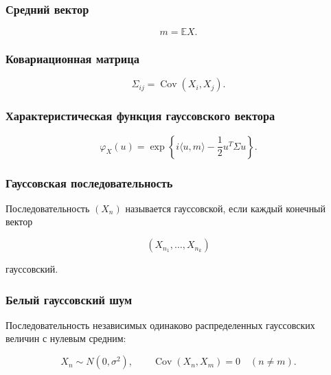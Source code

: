 \documentclass[
  11pt,
  a4paper,
]{article}
\begin{document}
\subsubsection{Средний
вектор}\label{ux441ux440ux435ux434ux43dux438ux439-ux432ux435ux43aux442ux43eux440}

\[
m=\mathbb EX.
\]

\subsubsection{Ковариационная
матрица}\label{ux43aux43eux432ux430ux440ux438ux430ux446ux438ux43eux43dux43dux430ux44f-ux43cux430ux442ux440ux438ux446ux430}

\[
\Sigma_{ij}=\operatorname{Cov}(X_i,X_j).
\]

\subsubsection{Характеристическая функция гауссовского
вектора}\label{ux445ux430ux440ux430ux43aux442ux435ux440ux438ux441ux442ux438ux447ux435ux441ux43aux430ux44f-ux444ux443ux43dux43aux446ux438ux44f-ux433ux430ux443ux441ux441ux43eux432ux441ux43aux43eux433ux43e-ux432ux435ux43aux442ux43eux440ux430}

\[
\varphi_X(u)
=
\exp\left\{
i\langle u,m\rangle-\frac12u^T\Sigma u
\right\}.
\]

\subsubsection{Гауссовская
последовательность}\label{ux433ux430ux443ux441ux441ux43eux432ux441ux43aux430ux44f-ux43fux43eux441ux43bux435ux434ux43eux432ux430ux442ux435ux43bux44cux43dux43eux441ux442ux44c}

Последовательность \((X_n)\) называется гауссовской, если каждый
конечный вектор

\[
(X_{n_1},\ldots,X_{n_k})
\]

гауссовский.

\subsubsection{Белый гауссовский
шум}\label{ux431ux435ux43bux44bux439-ux433ux430ux443ux441ux441ux43eux432ux441ux43aux438ux439-ux448ux443ux43c}

Последовательность независимых одинаково распределенных гауссовских
величин с нулевым средним:

\[
X_n\sim N(0,\sigma^2),
\qquad
\operatorname{Cov}(X_n,X_m)=0\quad(n\ne m).
\]
\end{document}
